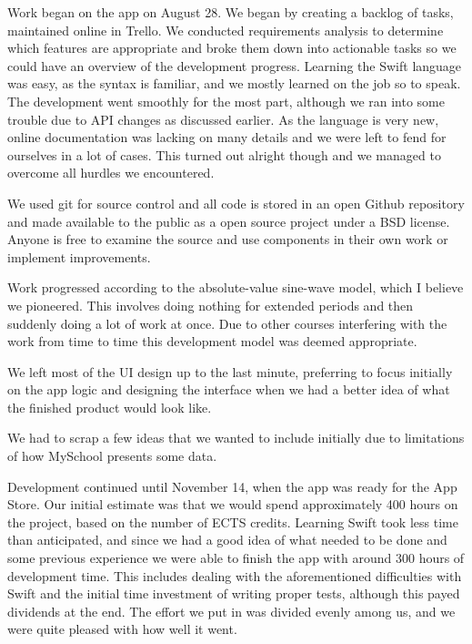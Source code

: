 \documentclass[pdftex, DIV=calc, paper=a4, fontsize=11pt]{scrartcl}	 %
\begin{document}
Work began on the app on August 28. We began by creating a backlog of tasks, maintained online in
Trello. We conducted requirements analysis to determine which features are appropriate and broke
them down into actionable tasks so we could
have an overview of the development progress. Learning the Swift language was easy, as the syntax
is familiar, and we mostly learned on the job so to speak. The development went smoothly for the
most part, although we ran into some trouble due to API changes as discussed earlier.
As the language is very new, online documentation was lacking on many details
and we were left to fend for ourselves in a lot of 
cases. This turned out alright though and we managed to overcome all hurdles we encountered.

We used git for source control and all code is stored in an open Github\cite{github} repository and made available
to the public as a open source project under a BSD license\cite{licence}. Anyone is free to examine the source
and use components in their own work or implement improvements.

Work progressed according to the absolute-value sine-wave model, which I believe we pioneered. This 
involves doing nothing for extended periods and then suddenly doing a lot of work at once. Due to 
other courses interfering with the work from time to time this development model was deemed 
appropriate.

We left most of the UI design up to the last minute, preferring to focus initially on the app logic
and designing the interface when we had a better idea of what the finished product would look like.

We had to scrap a few ideas that we wanted to include initially due to limitations of how MySchool
presents some data.

Development continued until November 14, when the app was ready for the App Store.
Our initial estimate was that we would spend approximately 400 hours on the project, based on the
number of ECTS credits. Learning Swift took less time than anticipated, and since we had a good idea
of what needed to be done and some previous experience we were able to finish the app with around
300 hours of development time. This includes dealing with the aforementioned difficulties with Swift
and the initial time investment of writing proper tests, although this payed dividends at the end.
The effort we put in was divided evenly among us, and we were quite pleased with how well it went.

\end{document}
